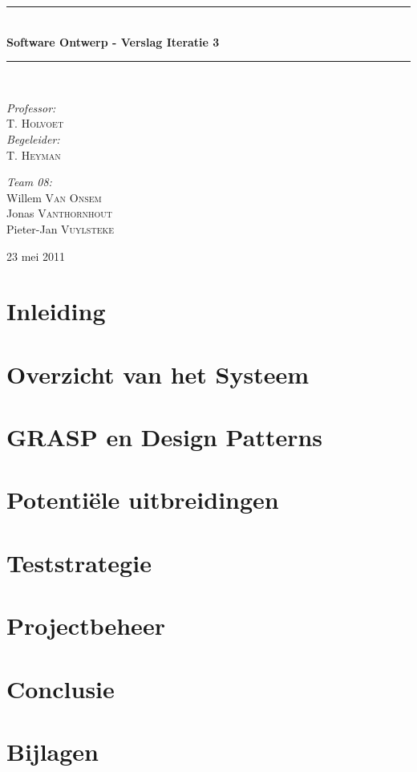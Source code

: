 \documentclass[a4paper,titlepage]{article}
\newcommand{\HRule}{\rule{\linewidth}{0.5mm}}
\begin{document}
\begin{empfile}
\begin{titlepage}
\begin{center}
\HRule \\[0.4cm]
{ \huge \bfseries Software Ontwerp - Verslag Iteratie 3}\\[0.4cm]
\HRule \\[1.5cm]
\begin{minipage}{0.4\textwidth}
\begin{flushleft} \large
\emph{Professor:}\\
T. \textsc{Holvoet}\\
\emph{Begeleider:}\\
T. \textsc{Heyman}
\end{flushleft}
\end{minipage}
\begin{minipage}{0.4\textwidth}
\begin{flushright} \large
\emph{Team 08:} \\
Willem \textsc{Van Onsem}\\
Jonas \textsc{Vanthornhout}\\
Pieter-Jan \textsc{Vuylsteke}
\end{flushright}
\end{minipage}

\vfill

{\large 23 mei 2011}
\end{center}
\end{titlepage}
\tableofcontents

\newpage
\section*{Inleiding}

\newpage
\section{Overzicht van het Systeem}

\section{GRASP en Design Patterns}

\section{Potenti\"ele uitbreidingen}

\section{Teststrategie}

\section{Projectbeheer}

\section{Conclusie}

\newpage
\appendix
\section{Bijlagen}

\end{empfile}
\end{document}
